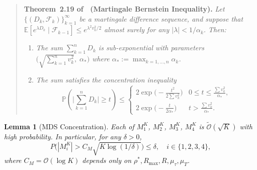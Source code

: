 \documentclass[letterpaper, 10 pt, conference]{IEEEconf}
\newtheorem{lemma}{Lemma}
\newcommand{\E}{\mathbb{E}}
\begin{document}
\begin{quote}
\textbf{Theorem~2.19 of~\cite{wainwright2019} (Martingale Bernstein Inequality).}
\textit{Let $\{(D_k, \mathcal{F}_k)\}_{k=1}^\infty$ be a martingale difference sequence, and suppose that $\E[e^{\lambda D_k} \mid \mathcal{F}_{k-1}] \le e^{\lambda^2 v_k^2 / 2}$ almost surely for any $|\lambda| < 1/\alpha_k$. Then:}
\begin{enumerate}
    \item[(a)] \textit{The sum $\sum_{k=1}^n D_k$ is sub-exponential with parameters $\big(\sqrt{\sum_{k=1}^n v_k^2},\; \alpha_*\big)$ where $\alpha_* := \max_{k=1,\ldots,n} \alpha_k$.}
    \item[(b)] \textit{The sum satisfies the concentration inequality}
    {\small
    \begin{equation}
        \mathbb{P}\!\left(\bigg|\sum_{k=1}^n D_k\bigg| \ge t\right) \le \begin{cases} 2\exp\!\Big(-\tfrac{t^2}{2\sum v_k^2}\Big) & 0 \le t \le \tfrac{\sum v_k^2}{\alpha_*}, \\[6pt] 2\exp\!\Big(-\tfrac{t}{2\alpha_*}\Big) & t > \tfrac{\sum v_k^2}{\alpha_*}. \end{cases}
    \end{equation}
    }
\end{enumerate}
\end{quote}

\begin{lemma}[MDS Concentration]
    \label{lem:mds_concentration}
    Each of $M_1^K$, $M_2^K$, $M_3^K$, $M_4^K$ is $\widetilde{\mathcal{O}}(\sqrt{K})$ with high probability. In particular, for any $\delta > 0$,
    \begin{equation}
        \label{eq:mds_bound}
        P\!\big(|M_i^K| > C_M \sqrt{K \log(1/\delta)}\big) \leq \delta, \quad i \in \{1, 2, 3, 4\},
    \end{equation}
    where $C_M = \mathcal{O}(\log K)$ depends only on $\rho^*, R_{\max}, R, \mu_\tau, \mu_T$.
\end{lemma}
\end{document}
